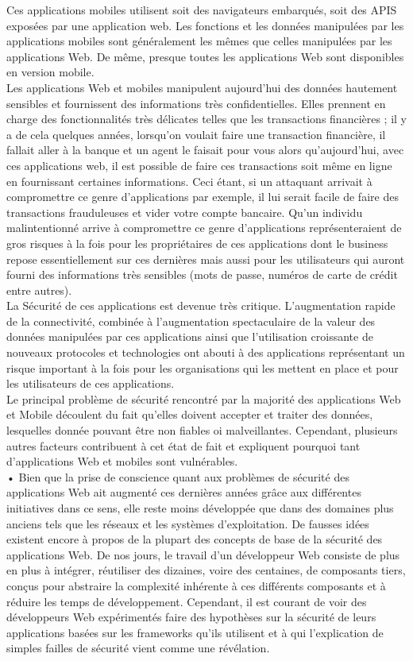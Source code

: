 Ces applications mobiles utilisent soit des navigateurs embarqués, soit des APIS exposées par une application web. Les fonctions et les données manipulées par les applications mobiles sont généralement les mêmes que celles manipulées par les applications Web. De même, presque toutes les applications Web sont disponibles en version mobile.\\
Les applications Web et mobiles manipulent aujourd'hui des données hautement sensibles et fournissent des informations très confidentielles. Elles prennent en charge des fonctionnalités très délicates telles que les transactions financières ; il y a de cela quelques années, lorsqu’on voulait faire une transaction financière, il fallait aller à la banque et un agent le faisait pour vous alors qu’aujourd’hui, avec ces applications web, il est possible de faire ces transactions soit même en ligne en fournissant certaines informations. Ceci étant, si un attaquant arrivait à compromettre ce genre d’applications par exemple, il lui serait facile de faire des transactions frauduleuses et vider votre compte bancaire. Qu’un individu malintentionné arrive à compromettre ce genre d’applications représenteraient de gros risques à la fois pour les propriétaires de ces applications dont le business repose essentiellement sur ces dernières mais aussi pour les utilisateurs qui auront fourni des informations très sensibles (mots de passe, numéros de carte de crédit entre autres). \\
La Sécurité de ces applications est devenue très critique. L’augmentation rapide de la connectivité, combinée à l’augmentation spectaculaire de la valeur des données manipulées par ces applications ainsi que l’utilisation croissante de nouveaux protocoles et technologies ont abouti à des applications représentant un risque important à la fois pour les organisations qui les mettent en place et pour les utilisateurs de ces applications.\\
Le principal problème de sécurité rencontré par la majorité des applications Web et Mobile découlent du fait qu’elles doivent accepter et traiter des données, lesquelles donnée pouvant être non fiables oi malveillantes. Cependant, plusieurs autres facteurs contribuent à cet état de fait et expliquent pourquoi tant d'applications Web et mobiles sont vulnérables.\\
• Bien que la prise de conscience quant aux problèmes de sécurité des applications Web ait augmenté ces dernières années grâce aux différentes initiatives dans ce sens, elle reste moins développée que dans des domaines plus anciens tels que les réseaux et les systèmes d'exploitation. De fausses idées existent encore à propos de la plupart des concepts de base de la sécurité des applications Web. De nos jours, le travail d’un développeur Web consiste de plus en plus à intégrer, réutiliser des dizaines, voire des centaines, de composants tiers, conçus pour abstraire la complexité inhérente à ces différents composants et à réduire les temps de développement. Cependant, il est courant de voir des développeurs Web expérimentés faire des hypothèses sur la sécurité de leurs applications basées sur les frameworks qu’ils utilisent et à qui l’explication de simples failles de sécurité vient comme une révélation.\\
